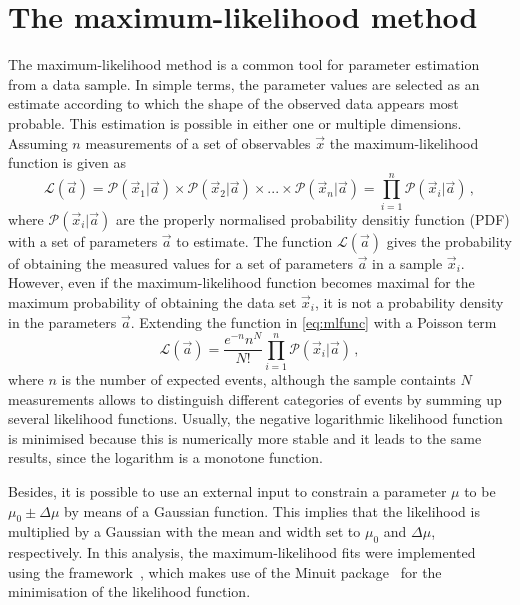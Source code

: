 \section{The maximum-likelihood method}
\label{sec:MLFit}

The maximum-likelihood method is a common tool for parameter estimation from a data sample.
In simple terms, the parameter values are selected as an estimate according to which the shape of the observed data appears most probable.
This estimation is possible in either one or multiple dimensions.
Assuming $n$ measurements of a set of observables $\vec{x}$ the maximum-likelihood function is given as
\begin{equation}
\mathcal{L}(\vec{a})=\mathcal{P}(\vec{x}_1|\vec{a})\times\mathcal{P}(\vec{x}_2|\vec{a})\times...\times\mathcal{P}(\vec{x}_n|\vec{a})=\prod_{i=1}^{n}\mathcal{P}(\vec{x}_i|\vec{a})\,,\label{eq:mlfunc}
\end{equation}
where $\mathcal{P}(\vec{x}_i|\vec{a})$ are the properly normalised probability densitiy function (PDF) with a set of parameters $\vec{a}$ to estimate.
The function $\mathcal{L}(\vec{a})$ gives the probability of obtaining the measured values for a set of parameters $\vec{a}$ in a sample $\vec{x}_i$.
However, even if the maximum-likelihood function becomes maximal for the maximum probability of obtaining the data set $\vec{x}_i$, it is not a probability density in the parameters $\vec{a}$.
Extending the function in \cref{eq:mlfunc} with a Poisson term
\begin{equation}
\mathcal{L}(\vec{a})=\frac{e^{-n}n^N}{N!}\prod_{i=1}^{n}\mathcal{P}(\vec{x}_i|\vec{a})\,,
\end{equation}
where $n$ is the number of expected events, although the sample containts $N$ measurements allows to distinguish different categories of events by summing up several likelihood functions.
Usually, the negative logarithmic likelihood function is minimised because this is numerically more stable and it leads to the same results, since the logarithm is a monotone function.

Besides, it is possible to use an external input to constrain a parameter $\mu$ to be $\mu_0\pm\Delta\mu$ by means of a Gaussian function.
This implies that the likelihood is multiplied by a Gaussian with the mean and width set to $\mu_0$ and $\Delta\mu$, respectively.
In this analysis, the maximum-likelihood fits were implemented using the \root framework~\cite{Antcheva:2009zz}, which makes use of the Minuit package~\cite{James:1975dr} for the minimisation of the likelihood function.


